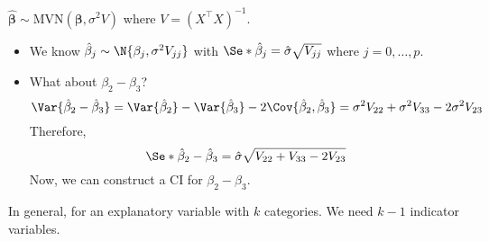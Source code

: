 $ \hat{\symbf{\beta}}\sim \text{MVN}(\symbf{\beta},\sigma^2 V) $
where $ V=(X^\top X)^{-1} $.
\begin{itemize}
  \item We know $ \hat{\beta}_j \sim \N{\beta_j,\sigma^2 V_{jj}} $
        with $ \Se*{\hat{\beta}_j}=\hat{\sigma}\sqrt{V_{jj}} $
        where $ j=0,\ldots,p $.
  \item What about $ \beta_2-\beta_3 $?
        \[ \Var{\hat{\beta}_2-\hat{\beta}_3}=
          \Var{\hat{\beta}_2}-\Var{\hat{\beta}_3}-2\Cov{\hat{\beta}_2,\hat{\beta}_3}
          =\sigma^2V_{22}+\sigma^2V_{33}-2\sigma^2V_{23} \]
        Therefore,
        \[ \Se*{\hat{\beta}_2-\hat{\beta}_3}=\hat{\sigma}\sqrt{V_{22}+V_{33}-2V_{23}} \]
        Now, we can construct a CI for $ \beta_2-\beta_3 $.
\end{itemize}
In general, for an explanatory variable with $ k $ categories.
We need $ k-1 $ indicator variables.

